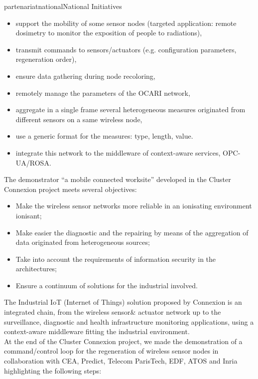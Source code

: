 \documentclass{ra2016}
\begin{document}
\begin{module}{partenariat}{national}{National Initiatives}
\begin{itemize}
    \item support the mobility of some sensor nodes (targeted application: remote dosimetry to monitor the exposition of people to radiations), 
    \item transmit commands to sensors/actuators (e.g. configuration parameters, regeneration order),
    \item ensure data gathering during node recoloring,  
    \item remotely manage the parameters of the OCARI network,
    \item aggregate in a single frame several heterogeneous measures originated from different sensors on a same wireless node, 
    \item use a generic format for the measures: type, length, value.
    \item integrate this network to the middleware of context-aware services, OPC-UA/ROSA. 
\end{itemize}

The demonstrator ``a mobile connected worksite''  developed in the Cluster Connexion project meets several objectives:
\begin{itemize}
    \item Make the wireless sensor networks more reliable in an  ionisating environment ionisant;
    \item Make easier the diagnostic and the repairing by means of the aggregation of data originated from heterogeneous sources; 
    \item Take into account the requirements of information security in the architectures;
    \item Ensure a continuum of solutions for the industrial involved.\\
\end{itemize}

The Industrial IoT (Internet of Things) solution proposed by Connexion is an integrated chain, from the wireless sensor\& actuator network up to the surveillance, diagnostic and health infrastructure monitoring applications, using a context-aware middleware fitting the industrial environment.\\ 

At the end of the Cluster Connexion project, we made the demonstration of a command/control loop for the regeneration of wireless sensor nodes in collaboration with CEA, Predict, Telecom ParisTech, EDF, ATOS and Inria highlighting the following steps:


\end{module}
\end{document}
